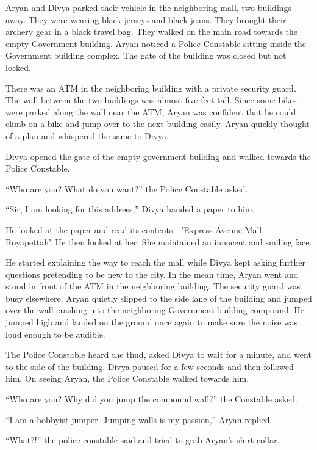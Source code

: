 Aryan and Divya parked their vehicle in the neighboring mall, two buildings
away. They were wearing black jerseys and black jeans. They brought their
archery gear in a black travel bag. They walked on the main road towards the
empty Government building. Aryan noticed a Police Constable sitting inside the
Government building complex. The gate of the building was closed but not locked.

There was an ATM in the neighboring building with a private security guard. The
wall between the two buildings was almost five feet tall. Since some bikes were
parked along the wall near the ATM, Aryan was confident that he could climb on a
bike and jump over to the next building easily. Aryan quickly thought of a plan
and whispered the same to Divya.

Divya opened the gate of the empty government building and walked towards the
Police Constable.

“Who are you? What do you want?” the Police Constable asked.

“Sir, I am looking for this address,” Divya handed a paper to him.

He looked at the paper and read its contents - 'Express Avenue Mall,
Royapettah'. He then looked at her. She maintained an innocent and smiling face.

He started explaining the way to reach the mall while Divya kept asking further
questions pretending to be new to the city. In the mean time, Aryan went and
stood in front of the ATM in the neighboring building. The security guard was
busy elsewhere. Aryan quietly slipped to the side lane of the building and
jumped over the wall crashing into the neighboring Government building compound.
He jumped high and landed on the ground once again to make sure the noise was
loud enough to be audible.

The Police Constable heard the thud, asked Divya to wait for a minute, and went
to the side of the building. Divya paused for a few seconds and then followed
him. On seeing Aryan, the Police Constable walked towards him.

“Who are you? Why did you jump the compound wall?” the Constable asked.

“I am a hobbyist jumper. Jumping walls is my passion,” Aryan replied.

“What?!” the police constable said and tried to grab Aryan's shirt collar.

